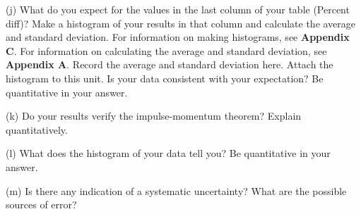 (j) What do you expect for the values in the last column of your table (Percent diff)? Make a histogram of your results in that column and calculate the average and standard deviation. For information on making histograms, see \textbf{Appendix C}. For information on calculating the average and standard deviation, see \textbf{Appendix A}. Record the average and standard deviation here.
Attach the histogram to this unit.
Is your data consistent with your expectation?  Be quantitative in your answer.
\vspace{20mm}

(k) Do your results verify the impulse-momentum theorem? Explain quantitatively.
\vspace{20mm}

(l) What does the histogram of your data tell you? Be quantitative in your answer.
\vspace{20mm}

(m) Is there any indication of a systematic uncertainty? What are the possible
sources of error?

